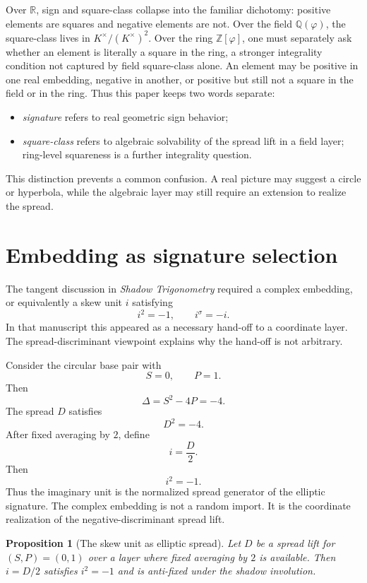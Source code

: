 \documentclass[11pt]{article}
\newtheorem{proposition}[definition]{Proposition}
\newcommand{\sig}{\sigma}
\newcommand{\ph}{\varphi}
\newcommand{\Z}{\mathbb{Z}}
\newcommand{\Q}{\mathbb{Q}}
\newcommand{\R}{\mathbb{R}}
\begin{document}
Over $\R$, sign and square-class collapse into the familiar dichotomy: positive elements are squares and negative elements are not.  Over the field $\Q(\ph)$, the square-class lives in $K^\times/(K^\times)^2$.  Over the ring $\Z[\ph]$, one must separately ask whether an element is literally a square in the ring, a stronger integrality condition not captured by field square-class alone.  An element may be positive in one real embedding, negative in another, or positive but still not a square in the field or in the ring.  Thus this paper keeps two words separate:
\begin{itemize}[leftmargin=2em]
    \item \emph{signature} refers to real geometric sign behavior;
    \item \emph{square-class} refers to algebraic solvability of the spread lift in a field layer; ring-level squareness is a further integrality question.
\end{itemize}

This distinction prevents a common confusion.  A real picture may suggest a circle or hyperbola, while the algebraic layer may still require an extension to realize the spread.

\section{Embedding as signature selection}

The tangent discussion in \emph{Shadow Trigonometry} required a complex embedding, or equivalently a skew unit $i$ satisfying
\[
    i^2=-1,
    \qquad
    i^\sig=-i.
\]
In that manuscript this appeared as a necessary hand-off to a coordinate layer.  The spread-discriminant viewpoint explains why the hand-off is not arbitrary.

Consider the circular base pair with
\[
    S=0,
    \qquad
    P=1.
\]
Then
\[
    \Delta=S^2-4P=-4.
\]
The spread $D$ satisfies
\[
    D^2=-4.
\]
After fixed averaging by $2$, define
\[
    i=\frac{D}{2}.
\]
Then
\[
    i^2=-1.
\]
Thus the imaginary unit is the normalized spread generator of the elliptic signature.  The complex embedding is not a random import.  It is the coordinate realization of the negative-discriminant spread lift.

\begin{proposition}[The skew unit as elliptic spread]\label{prop:skew-unit-spread}
Let $D$ be a spread lift for $(S,P)=(0,1)$ over a layer where fixed averaging by $2$ is available.  Then $i=D/2$ satisfies $i^2=-1$ and is anti-fixed under the shadow involution.
\end{proposition}
\end{document}
